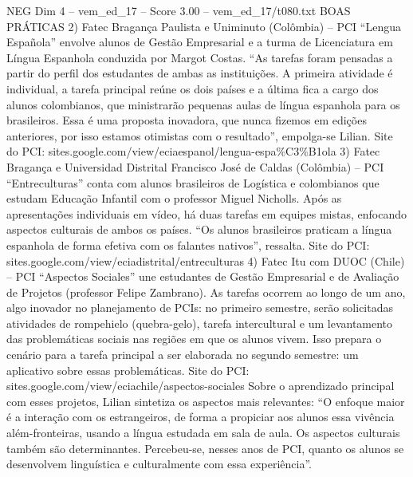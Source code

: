 \begin{textsample}{NEG Dim 4 – vem\_ed\_17 – Score 3.00 – vem\_ed\_17/t080.txt}  \label{ex:f4_neg_081}
BOAS PRÁTICAS 2) Fatec Bragança Paulista e Uniminuto (Colômbia) – PCI “Lengua Española” envolve alunos de Gestão Empresarial e a turma de Licenciatura em Língua Espanhola conduzida por Margot Costas. “As tarefas foram pensadas a partir do perfil dos estudantes de ambas as instituições.
A primeira atividade é individual, a tarefa principal reúne os dois países e a última fica a cargo dos alunos colombianos, que ministrarão pequenas aulas de língua espanhola para os brasileiros.
Essa é uma proposta inovadora, que nunca fizemos em edições anteriores, por isso estamos otimistas com o resultado”, empolga-se Lilian.
Site do PCI: sites.google.com/view/eciaespanol/lengua-espa\%C3\%B1ola 3) Fatec Bragança e Universidad Distrital Francisco José de Caldas (Colômbia) – PCI “Entreculturas” conta com alunos brasileiros de Logística e colombianos que estudam Educação Infantil com o professor Miguel Nicholls.
Após as apresentações individuais em vídeo, há duas tarefas em equipes mistas, enfocando aspectos culturais de ambos os países. “Os alunos brasileiros praticam a língua espanhola de forma efetiva com os falantes nativos”, ressalta.
Site do PCI: sites.google.com/view/eciadistrital/entreculturas 4) Fatec Itu com DUOC (Chile) – PCI “Aspectos Sociales” une estudantes de Gestão Empresarial e de Avaliação de Projetos (professor Felipe Zambrano).
As tarefas ocorrem ao longo de um ano, algo inovador no planejamento de PCIs: no primeiro semestre, serão solicitadas atividades de rompehielo (quebra-gelo), tarefa intercultural e um levantamento das problemáticas sociais nas regiões em que os alunos vivem.
Isso prepara o cenário para a tarefa principal a ser elaborada no segundo semestre: um aplicativo sobre essas problemáticas.
Site do PCI: sites.google.com/view/eciachile/aspectos-sociales Sobre o aprendizado principal com esses projetos, Lilian sintetiza os aspectos mais relevantes: “O enfoque maior é a interação com os estrangeiros, de forma a propiciar aos alunos essa vivência além-fronteiras, usando a língua estudada em sala de aula.
Os aspectos culturais também são determinantes.
Percebeu-se, nesses anos de PCI, quanto os alunos se desenvolvem linguística e culturalmente com essa experiência”.

\end{textsample}
